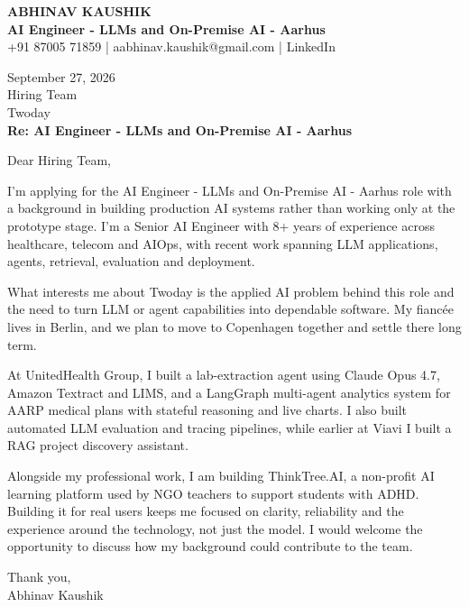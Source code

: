\documentclass[10pt,a4paper]{article}
\begin{document}
\begin{center}
{\Large\bfseries ABHINAV KAUSHIK}\\[2pt]
{\bfseries AI Engineer - LLMs and On-Premise AI - Aarhus}\\[2pt]
+91 87005 71859 \quad | \quad aabhinav.kaushik@gmail.com \quad | \quad LinkedIn
\end{center}
\vspace{8pt}
September 27, 2026\\[6pt]
Hiring Team\\
Twoday\\[4pt]
\textbf{Re: AI Engineer - LLMs and On-Premise AI - Aarhus}

Dear Hiring Team,

I’m applying for the AI Engineer - LLMs and On-Premise AI - Aarhus role with a background in building production AI systems rather than working only at the prototype stage. I’m a Senior AI Engineer with 8+ years of experience across healthcare, telecom and AIOps, with recent work spanning LLM applications, agents, retrieval, evaluation and deployment.

What interests me about Twoday is the applied AI problem behind this role and the need to turn LLM or agent capabilities into dependable software. My fiancée lives in Berlin, and we plan to move to Copenhagen together and settle there long term.

At UnitedHealth Group, I built a lab-extraction agent using Claude Opus 4.7, Amazon Textract and LIMS, and a LangGraph multi-agent analytics system for AARP medical plans with stateful reasoning and live charts. I also built automated LLM evaluation and tracing pipelines, while earlier at Viavi I built a RAG project discovery assistant.

Alongside my professional work, I am building ThinkTree.AI, a non-profit AI learning platform used by NGO teachers to support students with ADHD. Building it for real users keeps me focused on clarity, reliability and the experience around the technology, not just the model. I would welcome the opportunity to discuss how my background could contribute to the team.

Thank you,\\
Abhinav Kaushik
\end{document}
